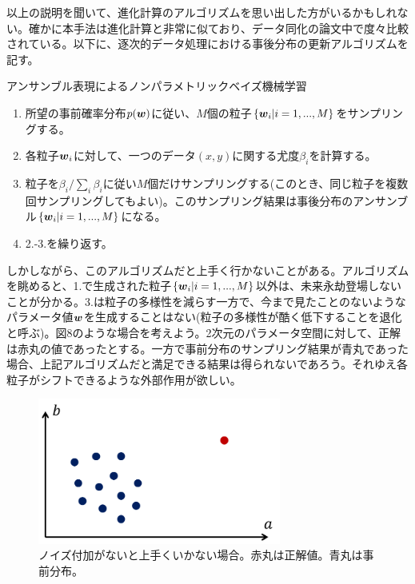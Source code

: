 \documentclass[dvipdfmx, 9pt, a4paper]{jsarticle}
\newcommand{\bm}[1]{{\mbox{\boldmath $#1$}}}
\begin{document}
以上の説明を聞いて、進化計算のアルゴリズムを思い出した方がいるかもしれない。確かに本手法は進化計算と非常に似ており、データ同化の論文中で度々比較されている。以下に、逐次的データ処理における事後分布の更新アルゴリズムを記す。\bigskip
\begin{itembox}[l]{アンサンブル表現によるノンパラメトリックベイズ機械学習}
\begin{enumerate}
\item 所望の事前確率分布$p(\bm w)$に従い、$M$個の粒子$\{ \bm w_i|i=1,...,M \}$をサンプリングする。
\item 各粒子$\bm w_i$に対して、一つのデータ$(x, y)$に関する尤度$\beta_i$を計算する。
\item 粒子を$\beta_i/\sum_i \beta_i$に従い$M$個だけサンプリングする(このとき、同じ粒子を複数回サンプリングしてもよい)。このサンプリング結果は事後分布のアンサンブル$\{ \bm w_i|i=1,...,M \}$になる。
\item 2.-3.を繰り返す。
\end{enumerate}
\end{itembox}\bigskip \par
しかしながら、このアルゴリズムだと上手く行かないことがある。アルゴリズムを眺めると、1.で生成された粒子$\{ \bm w_i|i=1,...,M \}$以外は、未来永劫登場しないことが分かる。3.は粒子の多様性を減らす一方で、今まで見たことのないようなパラメータ値$\bm w$を生成することはない(粒子の多様性が酷く低下することを退化と呼ぶ)。図8のような場合を考えよう。2次元のパラメータ空間に対して、正解は赤丸の値であったとする。一方で事前分布のサンプリング結果が青丸であった場合、上記アルゴリズムだと満足できる結果は得られないであろう。それゆえ各粒子がシフトできるような外部作用が欲しい。

\begin{figure}[b]
\begin{center}
\includegraphics[width=8cm]{"fig8.png"}
\caption{ノイズ付加がないと上手くいかない場合。赤丸は正解値。青丸は事前分布。}
\end{center}
\end{figure}
\end{document}
